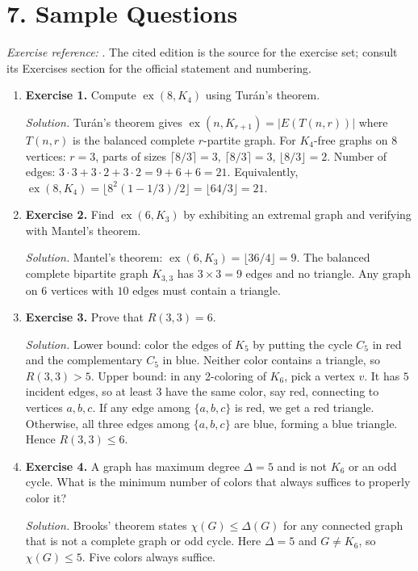 \section*{7. Sample Questions}
\emph{Exercise reference:} \cite{extremal_graph_theory_ref1}. The cited edition is the source for the exercise set; consult its Exercises section for the official statement and numbering.
\begin{enumerate}[leftmargin=*,itemsep=0.9em]
\item \textbf{Exercise 1.} Compute $\operatorname{ex}(8,K_4)$ using Tur\'an's theorem.

\emph{Solution.} Tur\'an's theorem gives $\operatorname{ex}(n,K_{r+1})=|E(T(n,r))|$ where $T(n,r)$ is the balanced complete $r$-partite graph. For $K_4$-free graphs on $8$ vertices: $r=3$, parts of sizes $\lceil8/3\rceil=3$, $\lceil8/3\rceil=3$, $\lfloor8/3\rfloor=2$. Number of edges: $3\cdot3+3\cdot2+3\cdot2=9+6+6=21$. Equivalently, $\operatorname{ex}(8,K_4)=\lfloor8^2(1-1/3)/2\rfloor=\lfloor64/3\rfloor=21$.

\item \textbf{Exercise 2.} Find $\operatorname{ex}(6,K_3)$ by exhibiting an extremal graph and verifying with Mantel's theorem.

\emph{Solution.} Mantel's theorem: $\operatorname{ex}(6,K_3)=\lfloor36/4\rfloor=9$. The balanced complete bipartite graph $K_{3,3}$ has $3\times3=9$ edges and no triangle. Any graph on $6$ vertices with $10$ edges must contain a triangle.

\item \textbf{Exercise 3.} Prove that $R(3,3)=6$.

\emph{Solution.} Lower bound: color the edges of $K_5$ by putting the cycle $C_5$ in red and the complementary $C_5$ in blue. Neither color contains a triangle, so $R(3,3)>5$. Upper bound: in any 2-coloring of $K_6$, pick a vertex $v$. It has $5$ incident edges, so at least $3$ have the same color, say red, connecting to vertices $a,b,c$. If any edge among $\{a,b,c\}$ is red, we get a red triangle. Otherwise, all three edges among $\{a,b,c\}$ are blue, forming a blue triangle. Hence $R(3,3)\leq6$.

\item \textbf{Exercise 4.} A graph has maximum degree $\Delta=5$ and is not $K_6$ or an odd cycle. What is the minimum number of colors that always suffices to properly color it?

\emph{Solution.} Brooks' theorem states $\chi(G)\leq\Delta(G)$ for any connected graph that is not a complete graph or odd cycle. Here $\Delta=5$ and $G\neq K_6$, so $\chi(G)\leq5$. Five colors always suffice.


\end{enumerate}
